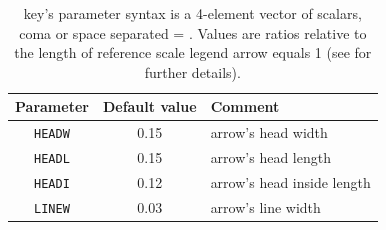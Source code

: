
\begin{table}
\caption{ key's parameter syntax is a 4-element vector of scalars, coma or space separated = . Values are ratios relative to the length of reference scale legend arrow equals 1 (see  for further details).}
\label{arrowshape}
\begin{center}
\begin{tabular}{|c|c|l|}
\hline
\textbf{Parameter} & \textbf{Default value} & \textbf{Comment}\\
\hline
\texttt{HEADW}	& 0.15	& arrow's head width\\
\hline
\texttt{HEADL}	& 0.15	& arrow's head length\\
\hline
\texttt{HEADI}	& 0.12	& arrow's head inside length\\
\hline
\texttt{LINEW}	& 0.03	& arrow's line width\\
\hline
\end{tabular}
\end{center}
\label{nodeidcodes}
\end{table}
